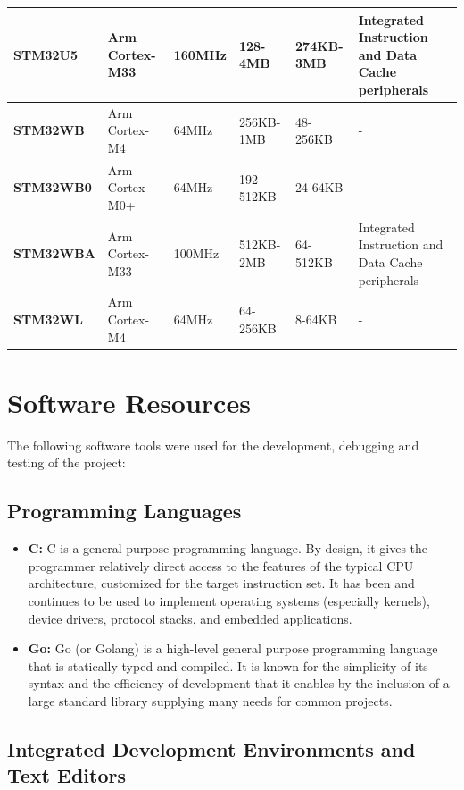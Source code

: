 \begin{xltabular}{\linewidth}{@{}>{\bfseries}l X@{} X@{} X@{} X@{} X@{}}
	\midrule
	STM32U5 &
	Arm Cortex-M33 &
	160MHz & 128-4MB & 274KB-3MB & Integrated Instruction and Data Cache peripherals \\
	\midrule
	STM32WB &
	Arm Cortex-M4 &
	64MHz & 256KB-1MB & 48-256KB & - \\
	\midrule
	STM32WB0 &
	Arm Cortex-M0+ &
	64MHz & 192-512KB & 24-64KB & - \\
	\midrule
	STM32WBA &
	Arm Cortex-M33 &
	100MHz & 512KB-2MB & 64-512KB & Integrated Instruction and Data Cache peripherals \\
	\midrule
	STM32WL &
	Arm Cortex-M4 &
	64MHz & 64-256KB & 8-64KB & - \\

\end{xltabular}

\section{Software Resources}
The following software tools were used for the development, debugging and testing of the project:
\subsection{Programming Languages}
\begin{itemize}
	\item \textbf{C:}
	 C is a general-purpose programming language. By design, it gives the programmer relatively direct access to the features of the typical CPU architecture, customized for the target instruction set. It has been and continues to be used to implement operating systems (especially kernels), device drivers, protocol stacks, and embedded applications.
	\item \textbf{Go:}
	 Go (or Golang) is a high-level general purpose programming language that is statically typed and compiled. It is known for the simplicity of its syntax and the efficiency of development that it enables by the inclusion of a large standard library supplying many needs for common projects.
\end{itemize}
\subsection{Integrated Development Environments and Text Editors}

